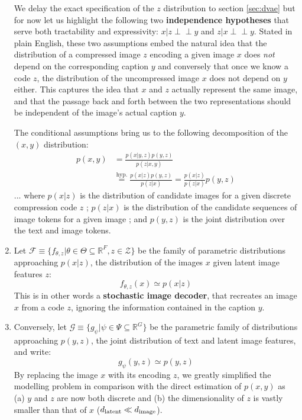 \documentclass{article}
\begin{document}
\begin{multicols}{2}
\begin{enumerate}
    We delay the exact specification of the $z$ distribution to section \ref{sec:dvae} but for now let us highlight the following two \textbf{independence hypotheses} that serve both tractability and expressivity: $x|z \perp\!\!\!\perp y$ and $z|x \perp\!\!\!\perp y$.
    Stated in plain English, these two assumptions embed the natural idea that the distribution of a compressed image $z$ encoding a given image $x$ does \textit{not} depend on the corresponding caption $y$ and conversely that once we know a code $z$, the distribution of the uncompressed image $x$ does not depend on $y$ either.
    This captures the idea that $x$ and $z$ actually represent the same image, and that the passage back and forth between the two representations should be independent of the image's actual caption $y$.
    
    The conditional assumptions bring us to the following decomposition of the $(x,y)$ distribution:
    \begin{align*}
        p(x,y) & =\frac{p(x|y,z)p(y,z)}{p(z|x,y)} \\
        & \overset{\text{hyp.}}{=}\frac{p(x|z)p(y,z)}{p(z|x)}=\frac{p(x|z)}{p(z|x)}p(y,z)
    \end{align*}
    ... where $p(x|z)$ is the distribution of candidate images for a given discrete compression code $z$ ; $p(z|x)$ is the distribution of the candidate sequences of image tokens for a given image ; and $p(y,z)$ is the joint distribution over the text and image tokens.
    
    \item Let $\mathcal{F}\equiv\{f_{\theta,z}|\theta\in\Theta\subseteq\mathbb{R}^{F}, z\in\mathcal{Z}\}$ be the family of parametric distributions approaching $p(x|z)$, the distribution of the images $x$ given latent image features $z$:
    $$f_{\theta,z}(x) \simeq p(x |z)$$
    This is in other words a \textbf{stochastic image decoder}, that recreates an image $x$ from a code $z$, ignoring the information contained in the caption $y$.
    
    \item Conversely, let $\mathcal{G} \equiv \{g_{\psi} | \psi\in\Psi \subseteq \mathbb{R}^{G} \}$ be the parametric family of distributions approaching $p(y,z)$, the joint distribution of text and latent image features, and write:
    $$g_{\psi}(y,z)\simeq p(y,z)$$
    By replacing the image $x$ with its encoding $z$, we greatly simplified the modelling problem in comparison with the direct estimation of $p(x,y)$ as (a) $y$ and $z$ are now both discrete and (b) the dimensionality of $z$ is vastly smaller than that of $x$ (${d_{\mathrm{latent}}}\ll d_{\mathrm{image}}$).
    

\end{enumerate}
\end{multicols}
\end{document}
